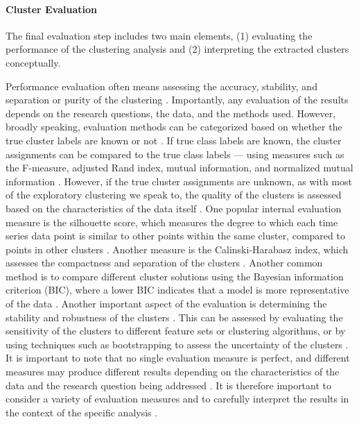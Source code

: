 \documentclass[man, 12pt, a4paper, mask, floatsintext]{apa7}
\theoremstyle{break}
\theoremstyle{plain}
\begin{document}


\paragraph{Cluster Evaluation}
The final evaluation step includes two main elements, (1) evaluating the performance of the clustering analysis and (2) interpreting the extracted clusters conceptually. 

Performance evaluation often means assessing the accuracy, stability, and separation or purity of the clustering \citep{keogh2003}. Importantly, any evaluation of the results depends on the research questions, the data, and the methods used. However, broadly speaking, evaluation methods can be categorized based on whether the true cluster labels are known or not \citep{saxena2017}. If true class labels are known, the cluster assignments can be compared to the true class labels --- using measures such as the F-measure, adjusted Rand index, mutual information, and normalized mutual information \citep[i.e., external evaluation; e.g.,][]{liao2005}. However, if the true cluster assignments are unknown, as with most of the exploratory clustering we speak to, the quality of the clusters is assessed based on the characteristics of the data itself \citep[i.e., internal evaluation; e.g.,][]{Aghabozorgi2015}. One popular internal evaluation measure is the silhouette score, which measures the degree to which each time series data point is similar to other points within the same cluster, compared to points in other clusters \citep{rousseeuw1987}. Another measure is the Calinski-Harabasz index, which assesses the compactness and separation of the clusters \citep{calinski1974}. Another common method is to compare different cluster solutions using the Bayesian information criterion (BIC), where a lower BIC indicates that a model is more representative of the data \citep{vandeschoot2017}. Another important aspect of the evaluation is determining the stability and robustness of the clusters \citep{berkhin2006}. This can be assessed by evaluating the sensitivity of the clusters to different feature sets or clustering algorithms, or by using techniques such as bootstrapping to assess the uncertainty of the clusters \citep{vinh2009}. It is important to note that no single evaluation measure is perfect, and different measures may produce different results depending on the characteristics of the data and the research question being addressed \citep{kittler1998}. It is therefore important to consider a variety of evaluation measures and to carefully interpret the results in the context of the specific analysis \citep{vinh2009}.
\end{document}
